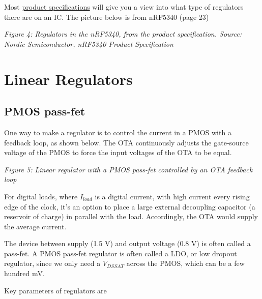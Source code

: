 Most
\href{https://docs.nordicsemi.com/bundle/nRF5340_PS_v1.3.1/resource/nRF5340_PS_v1.3.1.pdf}{product
specifications} will give you a view into what type of regulators there
are on an IC. The picture below is from nRF5340 (page 23)


{
\centering
{}
}

\emph{Figure 4: Regulators in the nRF5340, from the product
specification. Source: Nordic Semiconductor, nRF5340 Product
Specification}

\section{Linear Regulators}\label{linear-regulators}

\subsection{PMOS pass-fet}\label{pmos-pass-fet}

One way to make a regulator is to control the current in a PMOS with a
feedback loop, as shown below. The OTA continuously adjusts the
gate-source voltage of the PMOS to force the input voltages of the OTA
to be equal.


{
\centering
{}
}

\emph{Figure 5: Linear regulator with a PMOS pass-fet controlled by an
OTA feedback loop}

For digital loads, where \(I_{load}\) is a digital current, with high
current every rising edge of the clock, it's an option to place a large
external decoupling capacitor (a reservoir of charge) in parallel with
the load. Accordingly, the OTA would supply the average current.

The device between supply (1.5 V) and output voltage (0.8 V) is often
called a pass-fet. A PMOS pass-fet regulator is often called a LDO, or
low dropout regulator, since we only need a \(V_{DSSAT}\) across the
PMOS, which can be a few hundred mV.

Key parameters of regulators are

